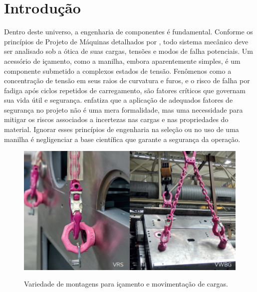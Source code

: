 \chapter{Introdução} \label{Introducao}



Dentro deste universo, a engenharia de componentes é fundamental. Conforme os princípios de Projeto de Máquinas detalhados por \textcite{Norton2013}, todo sistema mecânico deve ser analisado sob a ótica de suas cargas, tensões e modos de falha potenciais. Um acessório de içamento, como a manilha, embora aparentemente simples, é um componente submetido a complexos estados de tensão. Fenômenos como a concentração de tensão em seus raios de curvatura e furos, e o risco de falha por fadiga após ciclos repetidos de carregamento, são fatores críticos que governam sua vida útil e segurança. \textcite{Norton2013} enfatiza que a aplicação de adequados fatores de segurança no projeto não é uma mera formalidade, mas uma necessidade para mitigar os riscos associados a incertezas nas cargas e nas propriedades do material. Ignorar esses princípios de engenharia na seleção ou no uso de uma manilha é negligenciar a base científica que garante a segurança da operação.

\begin{figure}[!htb]
   \centering
    \caption{Variedade de montagens para içamento e movimentação de cargas.}
    \includegraphics[width=1.0\linewidth]{Figuras/icamentoexemplos.png}\\    \hspace{1.5cm}\raggedright \fontsize{10}{12}
    \label{rudexemplos}
\end{figure}

